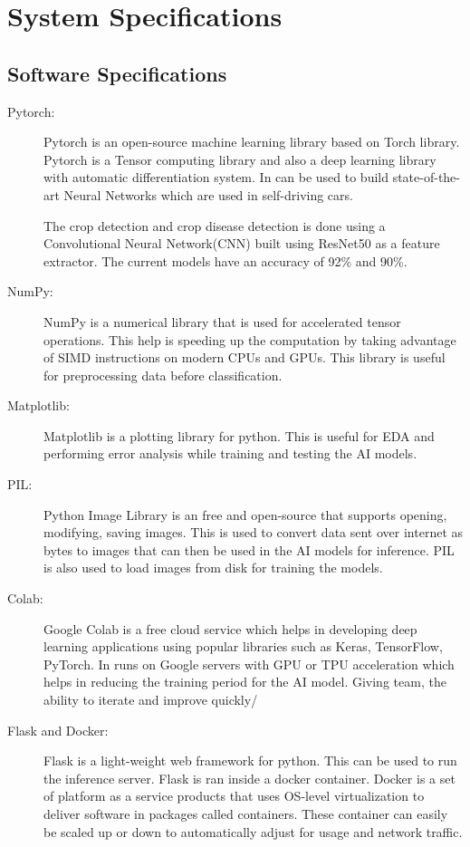\documentclass[../Report.tex]{subfiles}
\begin{document}
\section{System Specifications}

\subsection{Software Specifications}

\begin{description}
  \item[Pytorch: ] Pytorch is an open-source machine learning library based on Torch library. Pytorch is a Tensor computing library and also 
  a deep learning library with automatic differentiation system. In can be used to build state-of-the-art Neural Networks which are used in
  self-driving cars.\par
  The crop detection and crop disease detection is done using a Convolutional Neural Network(CNN) built using ResNet50 as a feature extractor.
  The current models have an accuracy of 92\% and 90\%.

  \item[NumPy: ] NumPy is a numerical library that is used for accelerated tensor operations. This help is speeding up the computation by 
  taking advantage of SIMD instructions on modern CPUs and GPUs. This library is useful for preprocessing data before classification.

  \item[Matplotlib: ] Matplotlib is a plotting library for python. This is useful for EDA and performing error analysis while training 
  and testing the AI models.

  \item[PIL: ] Python Image Library is an free and open-source that supports opening, modifying, saving images. This is used to convert data
  sent over internet as bytes to images that can then be used in the AI models for inference. PIL is also used to load images from disk for
  training the models.

  \item[Colab: ] Google Colab is a free cloud service which helps in developing deep learning applications using popular libraries such 
  as Keras, TensorFlow, PyTorch. In runs on Google servers with GPU or TPU acceleration which helps in reducing the training period for 
  the AI model. Giving team, the ability to iterate and improve quickly/

  \item[Flask and Docker: ] Flask is a light-weight web framework for python. This can be used to run the inference server. Flask is ran
  inside a docker container. Docker is a set of platform as a service products that uses OS-level virtualization to deliver software in 
  packages called containers. These container can easily be scaled up or down to automatically adjust for usage and network traffic.


\end{description}
\end{document}
